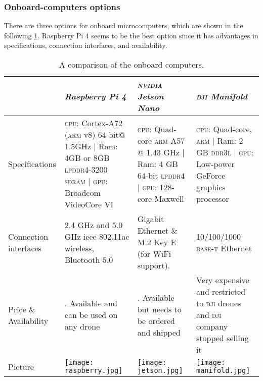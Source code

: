 \documentclass[../main.tex]{subfiles}
\begin{document}
\subsubsection{Onboard-computers options}
There are three options for onboard microcomputers, 
which are shown in the following 
\cref{tab:onboard-computers}. Raspberry Pi 4 seems 
to be the best option since it has advantages 
in specifications, connection interfaces, 
and availability.

\begin{table}[tbp]
	\centering
	\caption{A comparison of the onboard computers.}
	\label{tab:onboard-computers}  
	\begin{tabular}{ p{3cm} p{4cm} p{4cm} p{4cm} }
		\toprule
		\textit{} & \textit{Raspberry Pi 4} & \textit{\textsc{nvidia} Jetson Nano} & 
		\textit{\textsc{dji} Manifold}\\ \midrule
		Specifications  & \textsc{cpu}: Cortex-A72 (\textsc{arm} v8) 64-bit@ 1.5GHz | Ram: 4GB or 8GB \textsc{lpddr4}-3200 \textsc{sdram} | \textsc{gpu}: Broadcom VideoCore VI & 
		\textsc{cpu}: Quad-core \textsc{arm} A57 @ 1.43 GHz | Ram: 4 GB 64-bit 
		\textsc{lpddr4}   | \textsc{gpu}: 128-core Maxwell & \textsc{cpu}: Quad-core, 
		\textsc{arm} | Ram: 2 GB \textsc{ddr3l} | \textsc{gpu}: Low-power GeForce
		 graphics processor \\ \addlinespace
		Connection interfaces & 2.4 GHz and 5.0 GHz \gls{ieee} 802.11ac wireless,
		 Bluetooth 5.0 & Gigabit Ethernet \& M.2 Key E (for WiFi support). &10/100/1000 
		 \textsc{base-t} Ethernet \\ \addlinespace
		
		Price \& Availability & \qar{300}. Available and can be used on any drone & 
		\qar{400}. Available but needs to be ordered and shipped & Very expensive 
		and restricted to \textsc{dji} drones and \textsc{dji} company stopped 
		selling it \\ \addlinespace
		Picture & \begin{minipage}{.2\textwidth}
			\texttt{[image: raspberry.jpg]}
		\end{minipage}  & \begin{minipage}{.2\textwidth}
			\texttt{[image: jetson.jpg]}
		\end{minipage} & \begin{minipage}{.2\textwidth}
			\texttt{[image: manifold.jpg]}
		\end{minipage} \\
		\bottomrule
	\end{tabular}
\end{table}
\end{document}
